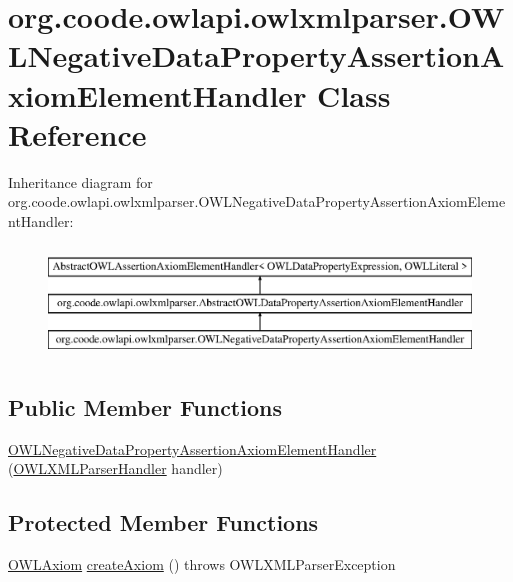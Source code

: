 \hypertarget{classorg_1_1coode_1_1owlapi_1_1owlxmlparser_1_1_o_w_l_negative_data_property_assertion_axiom_element_handler}{\section{org.\-coode.\-owlapi.\-owlxmlparser.\-O\-W\-L\-Negative\-Data\-Property\-Assertion\-Axiom\-Element\-Handler Class Reference}
\label{classorg_1_1coode_1_1owlapi_1_1owlxmlparser_1_1_o_w_l_negative_data_property_assertion_axiom_element_handler}
}
Inheritance diagram for org.\-coode.\-owlapi.\-owlxmlparser.\-O\-W\-L\-Negative\-Data\-Property\-Assertion\-Axiom\-Element\-Handler\-:\begin{figure}[H]
\begin{center}
\leavevmode
\includegraphics[height=3.000000cm]{classorg_1_1coode_1_1owlapi_1_1owlxmlparser_1_1_o_w_l_negative_data_property_assertion_axiom_element_handler}
\end{center}
\end{figure}
\subsection*{Public Member Functions}
\begin{DoxyCompactItemize}
\item 
\hyperlink{classorg_1_1coode_1_1owlapi_1_1owlxmlparser_1_1_o_w_l_negative_data_property_assertion_axiom_element_handler_a14a917bc8bd62cd911d828c32a87a810}{O\-W\-L\-Negative\-Data\-Property\-Assertion\-Axiom\-Element\-Handler} (\hyperlink{classorg_1_1coode_1_1owlapi_1_1owlxmlparser_1_1_o_w_l_x_m_l_parser_handler}{O\-W\-L\-X\-M\-L\-Parser\-Handler} handler)
\end{DoxyCompactItemize}
\subsection*{Protected Member Functions}
\begin{DoxyCompactItemize}
\item 
\hyperlink{interfaceorg_1_1semanticweb_1_1owlapi_1_1model_1_1_o_w_l_axiom}{O\-W\-L\-Axiom} \hyperlink{classorg_1_1coode_1_1owlapi_1_1owlxmlparser_1_1_o_w_l_negative_data_property_assertion_axiom_element_handler_ae01d0200541a2c9f6a57f40acc4ded3a}{create\-Axiom} ()  throws O\-W\-L\-X\-M\-L\-Parser\-Exception 
\end{DoxyCompactItemize}


